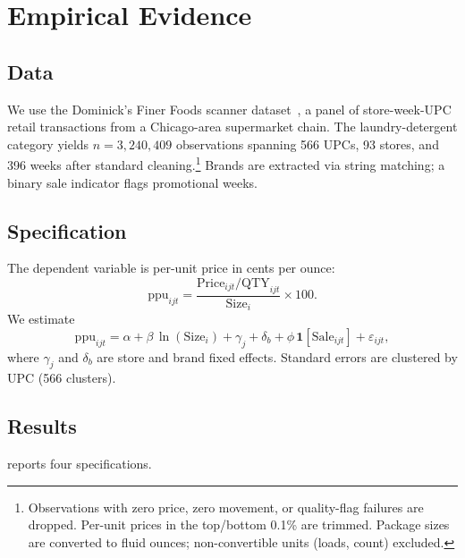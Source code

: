 \documentclass[11pt,a4paper]{article}
\theoremstyle{plain}
\theoremstyle{definition}
\theoremstyle{remark}
\begin{document}
\section{Empirical Evidence}\label{sec:empirical}

\subsection{Data}

We use the Dominick's Finer Foods scanner dataset~\cite{Dominicks}, a panel of store-week-UPC retail transactions from a Chicago-area supermarket chain.
The laundry-detergent category yields $n=3{,}240{,}409$ observations spanning 566 UPCs, 93 stores, and 396 weeks after standard cleaning.\footnote{%
  Observations with zero price, zero movement, or quality-flag failures are dropped.
  Per-unit prices in the top/bottom 0.1\% are trimmed.
  Package sizes are converted to fluid ounces; non-convertible units (loads, count) excluded.}
Brands are extracted via string matching; a binary sale indicator flags promotional weeks.

\subsection{Specification}

The dependent variable is per-unit price in cents per ounce:
\begin{equation}\label{eq:ppu}
  \mathrm{ppu}_{ijt} = \frac{\mathrm{Price}_{ijt}/\mathrm{QTY}_{ijt}}{\mathrm{Size}_i}\times 100.
\end{equation}
We estimate
\begin{equation}\label{eq:reg}
  \mathrm{ppu}_{ijt}
    = \alpha + \beta\,\ln(\mathrm{Size}_i)
    + \gamma_j + \delta_b + \phi\,\mathbf{1}[\mathrm{Sale}_{ijt}]
    + \varepsilon_{ijt},
\end{equation}
where $\gamma_j$ and $\delta_b$ are store and brand fixed effects.
Standard errors are clustered by UPC (566 clusters).

\subsection{Results}

 reports four specifications.


\end{document}
